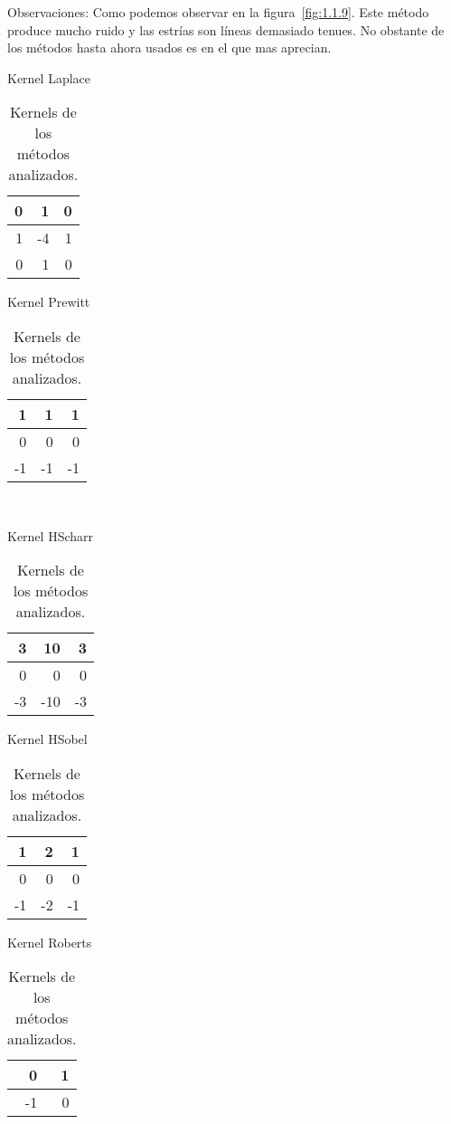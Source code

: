 Observaciones:
Como podemos observar en la figura~\ref{fig:1.1.9}.
Este método produce mucho ruido y las estrías son líneas demasiado tenues.
No obstante de los métodos hasta ahora usados es en el que mas aprecian.


\begin{table}[]

	\begin{minipage}{.5\linewidth}
		\centering
		\caption{Kernel Laplace}
		\label{F_k1}
		\begin{tabular}{|r|r|r|}
			\hline
			0 & 1  & 0 \\ \hline
			1 & -4 & 1 \\ \hline
			0 & 1  & 0 \\ \hline
		\end{tabular}
    \end{minipage}%
	\begin{minipage}{.5\linewidth}
		\centering
		\caption{Kernel Prewitt}
		\label{F_k2}
		\begin{tabular}{|r|r|r|}
			\hline
			1  & 1   & 1 \\ \hline
			0  & 0   & 0 \\ \hline
			-1 & -1  & -1 \\ \hline
		\end{tabular}
    \end{minipage}%
    \\

	\begin{minipage}{.5\linewidth}
		\centering
		\caption{Kernel HScharr}
		\label{F_k3}
		\begin{tabular}{|r|r|r|}
			\hline
			3  & 10  & 3 \\ \hline
			0  & 0   & 0 \\ \hline
			-3 & -10 & -3 \\ \hline
		\end{tabular}
    \end{minipage}%
	\begin{minipage}{.5\linewidth}
		\centering
		\caption{Kernel HSobel}
		\label{F_k4}
		\begin{tabular}{|r|r|r|}
			\hline
			1  & 2  & 1 \\ \hline
			0  & 0  & 0 \\ \hline
			-1 & -2 & -1 \\ \hline
		\end{tabular}
    \end{minipage}%
    
	\begin{minipage}{.5\linewidth}
		\centering
		\caption{Kernel Roberts}
		\label{F_k5}
		\begin{tabular}{|r|r|}
			\hline
			0  & 1 \\ \hline
			-1 & 0 \\ \hline
		\end{tabular}
    \end{minipage}%
	\caption{Kernels de los métodos analizados.}
\end{table}


